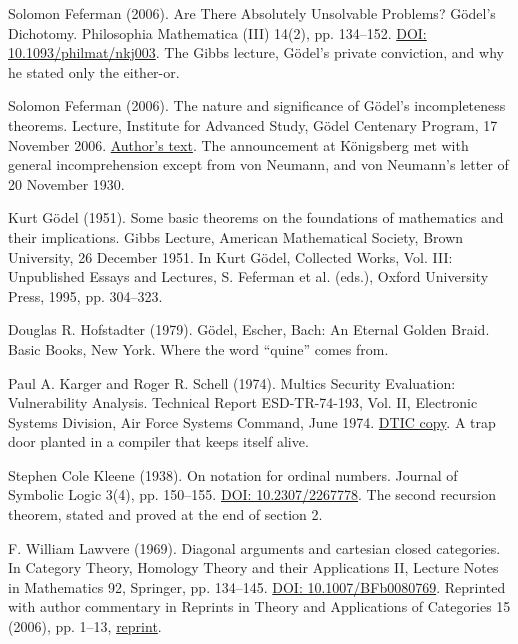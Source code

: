 \noindent Solomon Feferman (2006). Are There Absolutely Unsolvable Problems? G\"odel's Dichotomy. Philosophia Mathematica (III) 14(2), pp. 134--152. \href{https://doi.org/10.1093/philmat/nkj003}{DOI: 10.1093/philmat/nkj003}. The Gibbs lecture, G\"odel's private conviction, and why he stated only the either-or.
\par\medskip

\noindent Solomon Feferman (2006). The nature and significance of G\"odel's incompleteness theorems. Lecture, Institute for Advanced Study, G\"odel Centenary Program, 17 November 2006. \href{https://math.stanford.edu/~feferman/papers/Godel-IAS.pdf}{Author's text}. The announcement at K\"onigsberg met with general incomprehension except from von Neumann, and von Neumann's letter of 20 November 1930.
\par\medskip

\noindent Kurt G\"odel (1951). Some basic theorems on the foundations of mathematics and their implications. Gibbs Lecture, American Mathematical Society, Brown University, 26 December 1951. In Kurt G\"odel, Collected Works, Vol. III: Unpublished Essays and Lectures, S. Feferman et al. (eds.), Oxford University Press, 1995, pp. 304--323.
\par\medskip

\noindent Douglas R. Hofstadter (1979). G\"odel, Escher, Bach: An Eternal Golden Braid. Basic Books, New York. Where the word ``quine'' comes from.
\par\medskip

\noindent Paul A. Karger and Roger R. Schell (1974). Multics Security Evaluation: Vulnerability Analysis. Technical Report ESD-TR-74-193, Vol. II, Electronic Systems Division, Air Force Systems Command, June 1974. \href{https://apps.dtic.mil/sti/pdfs/ADA001120.pdf}{DTIC copy}. A trap door planted in a compiler that keeps itself alive.
\par\medskip

\noindent Stephen Cole Kleene (1938). On notation for ordinal numbers. Journal of Symbolic Logic 3(4), pp. 150--155. \href{https://doi.org/10.2307/2267778}{DOI: 10.2307/2267778}. The second recursion theorem, stated and proved at the end of section 2.
\par\medskip

\noindent F. William Lawvere (1969). Diagonal arguments and cartesian closed categories. In Category Theory, Homology Theory and their Applications II, Lecture Notes in Mathematics 92, Springer, pp. 134--145. \href{https://doi.org/10.1007/BFb0080769}{DOI: 10.1007/BFb0080769}. Reprinted with author commentary in Reprints in Theory and Applications of Categories 15 (2006), pp. 1--13, \href{https://www.tac.mta.ca/tac/reprints/articles/15/tr15abs.html}{reprint}.
\par\medskip

